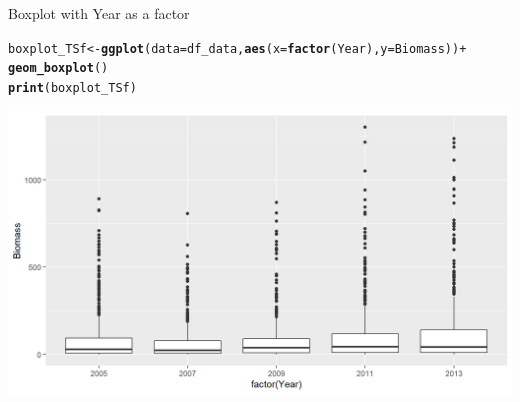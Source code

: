 \documentclass{beamer}\usepackage[]{graphicx}\usepackage[]{color}
\makeatletter
\newcommand{\hlopt}[1]{\textcolor[rgb]{0,0,0}{#1}}%
\newcommand{\hlstd}[1]{\textcolor[rgb]{0.345,0.345,0.345}{#1}}%
\newcommand{\hlkwb}[1]{\textcolor[rgb]{0.69,0.353,0.396}{#1}}%
\newcommand{\hlkwc}[1]{\textcolor[rgb]{0.333,0.667,0.333}{#1}}%
\newcommand{\hlkwd}[1]{\textcolor[rgb]{0.737,0.353,0.396}{\textbf{#1}}}%
\newenvironment{kframe}{%
 \def\at@end@of@kframe{}%
 \ifinner\ifhmode%
  \def\at@end@of@kframe{\end{minipage}}%
  \begin{minipage}{\columnwidth}%
 \fi\fi%
 \def\FrameCommand##1{\hskip\@totalleftmargin \hskip-\fboxsep
 \colorbox{shadecolor}{##1}\hskip-\fboxsep
     \hskip-\linewidth \hskip-\@totalleftmargin \hskip\columnwidth}%
 \MakeFramed {\advance\hsize-\width
   \@totalleftmargin\z@ \linewidth\hsize
   \@setminipage}}%
 {\par\unskip\endMakeFramed%
 \at@end@of@kframe}
\newenvironment{knitrout}{}{} %
\makeatother
\begin{document}
\begin{frame}[fragile]{Boxplot with Year as a factor}
\begin{knitrout}\footnotesize
{}\color{fgcolor}\begin{kframe}
\begin{alltt}
\hlstd{boxplot_TSf} \hlkwb{<-} \hlkwd{ggplot}\hlstd{(}\hlkwc{data}\hlstd{=df_data,} \hlkwd{aes}\hlstd{(}\hlkwc{x}\hlstd{=}\hlkwd{factor}\hlstd{(Year),} \hlkwc{y}\hlstd{=Biomass))} \hlopt{+}
  \hlkwd{geom_boxplot}\hlstd{()}
\hlkwd{print}\hlstd{(boxplot_TSf)}
\end{alltt}
\end{kframe}

{\centering \includegraphics[width=.9\linewidth]{figure/boxplot_TSf-1} 

}



\end{knitrout}
\end{frame}
\end{document}
